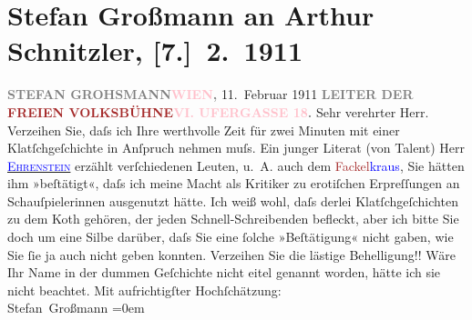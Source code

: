 

               \section[Stefan Großmann an Arthur Schnitzler, {[}7.{]} 2. 1911]{ Stefan Großmann an Arthur Schnitzler,
                    {[}7.{]} 2. 1911}\nopagebreak{}\rehead{ }\normalsize\beginnumbering{} \toendnotes[C]{\smallbreak\pagebreak[2]} 
\pstart
           {\pb}\textcolor{gray}{\textbf{STEFAN GROHSMANN}}\hfill \textcolor{gray}{\textbf{\textcolor{pink}{WIEN}{}\ledrightnote{\textcolor{pink}{Wien}},}}{ }11. Februar 1911\pend
           \pstart
           \textcolor{gray}{\textbf{LEITER DER \textcolor{brown}{FREIEN
                                    VOLKSBÜHNE}{}\ledrightnote{\textcolor{brown}{Wiener Freie Volksbühne}}}}\hfill \textcolor{gray}{\textbf{\textcolor{pink}{VI. UFERGASSE 18}{}\ledrightnote{\textcolor{pink}{Linke Wienzeile}}.}}\pend
           \pstart\center{}Sehr verehrter Herr.\pend\pstart
           Verzeihen Sie, daſs ich Ihre werthvolle Zeit für zwei Minuten mit einer
                    Klatſchgeſchichte  in Anſpruch nehmen
                    muſs.\pend
           \pstart
           Ein junger Literat (von Talent) Herr \uline{\textcolor{blue}{\textsc{Ehrenstein}}{}\ledrightnote{\textcolor{blue}{Albert Ehrenstein}}} erzählt verſchiedenen Leuten, u. A. auch dem \textcolor{blue}{\textcolor{brown}{Fackel}{}\ledrightnote{\textcolor{brown}{Die Fackel}}kraus}{}\ledrightnote{\textcolor{blue}{Karl Kraus}}, Sie hätten ihm
                    »beſtätigt«, daſs ich meine Macht als Kritiker zu erotiſchen Erpreſſungen an
                    Schauſpielerinnen ausgenutzt hätte.\pend
           \pstart
           Ich weiß wohl, daſs derlei Klatſchgeſchichten zu dem Koth gehören, der jeden
                    Schnell-Schreibenden befleckt, aber ich bitte Sie doch um eine Silbe darüber,
                    daſs Sie eine ſolche »Beſtätigung« nicht gaben, wie Sie ſie ja auch nicht geben
                    konnten.\pend
           \pstart
           Verzeihen Sie die lästige Behelligung!! Wäre Ihr Name in der dummen Geſchichte
                    nicht eitel genannt worden, hätte ich sie nicht beachtet.\pend
           \pstart
           Mit aufrichtigſter Hochſchätzung:{\\[\baselineskip]}\spacefill\mbox{Stefan Großmann}\pend
           \leftskip=0em{}\endnumbering{}  
      